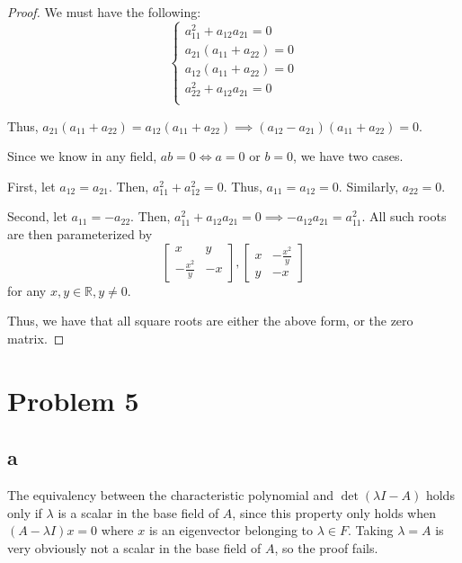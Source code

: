 \documentclass[12pt,letterpaper]{article}
\theoremstyle{definition}
\newcommand{\R}{\mathbb{R}}
\begin{document}
\begin{proof}
  We must have the following:
  \[
    \begin{cases}
      a_{11}^2 + a_{12}a_{21} = 0 \\
      a_{21}(a_{11} + a_{22}) = 0 \\
      a_{12}(a_{11} + a_{22}) = 0 \\
      a_{22}^2 + a_{12}a_{21} = 0 \\
    \end{cases}
  \]

  Thus, $a_{21}(a_{11} + a_{22}) = a_{12}(a_{11} + a_{22}) \implies (a_{12} -
  a_{21})(a_{11} + a_{22}) = 0$.

  Since we know in any field, $ab = 0 \iff a = 0$ or $b = 0$, we have two cases.

  First, let $a_{12} = a_{21}$. Then, $a_{11}^2 + a_{12}^2 = 0$. Thus, $a_{11} =
  a_{12} = 0$. Similarly, $a_{22} = 0$.

  Second, let $a_{11} = -a_{22}$. Then, $a_{11}^2 + a_{12}a_{21} = 0 \implies
  -a_{12}a_{21} = a_{11}^2$. All such roots are then parameterized by \[
    \begin{bmatrix}
      x & y \\
      -\frac{x^2}{y} & -x
    \end{bmatrix},
    \begin{bmatrix}
      x & -\frac{x^2}{y} \\
      y & -x
    \end{bmatrix}
  \] for any $x, y \in \R, y \neq 0$.

  Thus, we have that all square roots are either the above form, or the zero matrix.
\end{proof}

\section*{Problem 5}

\subsection*{a}

The equivalency between the characteristic polynomial and $\det(\lambda I - A)$
holds only if $\lambda$ is a scalar in the base field of $A$, since this
property only holds when $(A - \lambda I)x = 0$ where $x$ is an eigenvector
belonging to $\lambda \in F$. Taking $\lambda = A$ is very obviously not a
scalar in the base field of $A$, so the proof fails.
\end{document}
